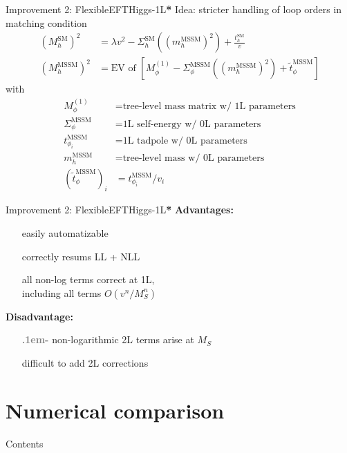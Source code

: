\documentclass[hyperref={pdfpagelabels=false},ngerman]{beamer}
\newcommand{\cmark}{\ding{51}}%
\newcommand{\xmark}{\ding{55}}%
\newcommand{\ok}{\textcolor{darkgreen}{\cmark}}
\newcommand{\notok}{\textcolor{red}{\xmark}}
\newcommand{\meh}{\textcolor{gray}{\textbf{\huge\lower.1em\hbox{-}}}}
\renewcommand{\emph}{\textbf}
\newcommand{\SM}{\ensuremath{\text{SM}}}
\newcommand{\MSSM}{\ensuremath{\text{MSSM}}}
\newcommand{\fsstar}{\textbf{*}}
\begin{document}
\begin{frame}{Improvement 2: FlexibleEFTHiggs-1L\fsstar}
  Idea: stricter handling of loop orders in matching condition
  \begin{align*}
    (M_h^\SM)^2 &= \lambda v^2 - \Sigma^{\SM}_h((m_h^\MSSM)^2) + \frac{t_h^\SM}{v}\\
    (M_h^\MSSM)^2 &= \text{EV of } \left[M_\phi^{(1)} - \Sigma^{\MSSM}_\phi((m_h^\MSSM)^2) + \tilde{t}_\phi^\MSSM\right]
  \end{align*}
  with
  \begin{align*}
    M_\phi^{(1)} &= \text{tree-level mass matrix w/ 1L parameters} \\
    \Sigma^{\MSSM}_\phi &= \text{1L self-energy w/ 0L parameters} \\
    t^{\MSSM}_{\phi_i} &= \text{1L tadpole w/ 0L parameters} \\
    m_h^\MSSM &= \text{tree-level mass w/ 0L parameters} \\
    (\tilde{t}^{\MSSM}_\phi)_i &= t^{\MSSM}_{\phi_i} / v_i
  \end{align*}
\end{frame}

\begin{frame}{Improvement 2: FlexibleEFTHiggs-1L\fsstar}
  \emph{Advantages:}
  \begin{itemize}
  \item[\ok] easily automatizable
  \item[\ok] correctly resums LL + NLL
  \item[\ok] all non-log terms correct at 1L, \\
    including all terms $O(v^n/M_S^n)$
  \end{itemize}
  \emph{Disadvantage:}
  \begin{itemize}
  \item[\meh] non-logarithmic 2L terms arise at $M_S$
  \item[\notok] difficult to add 2L corrections
  \end{itemize}
\end{frame}


\section{Numerical comparison}

\begin{frame}{Contents}
  \tableofcontents[currentsection]  
\end{frame}
\end{document}

